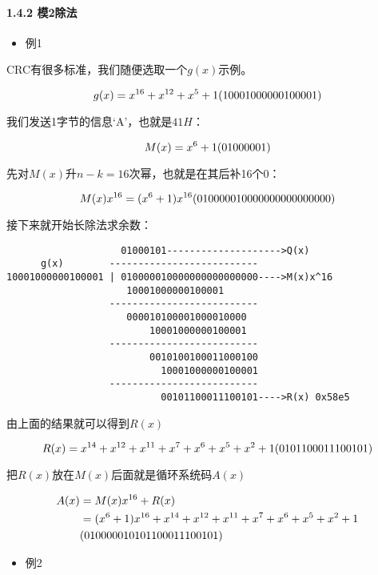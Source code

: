 \documentclass[
]{article}
\begin{document}
\hypertarget{header-n87}{%
\paragraph{1.4.2 模2除法}\label{header-n87}}

\begin{itemize}
\item
  例1
\end{itemize}

CRC有很多标准，我们随便选取一个\(g(x)\)示例。

\[g(x)=x^{16}+x^{12}+x^5+1\\
(10001000000100001)\]

我们发送1字节的信息`A'，也就是\(41H\)：

\[M(x)=x^6+1\\
(01000001)\]

先对\(M(x)\)升\(n-k=16\)次幂，也就是在其后补16个0：

\[M(x)x^{16}=(x^6+1)x^{16}\\
(010000010000000000000000)\]

接下来就开始长除法求余数：

\begin{verbatim}
                    01000101-------------------->Q(x)
      g(x)        --------------------------
10001000000100001 | 010000010000000000000000---->M(x)x^16
                     10001000000100001
                  --------------------------
                     000010100001000010000
                         10001000000100001
                  --------------------------
                         0010100100011000100
                           10001000000100001
                  --------------------------
                           00101100011100101---->R(x) 0x58e5
\end{verbatim}

由上面的结果就可以得到\(R(x)\)

\[R(x)=x^{14}+x^{12}+x^{11}+x^{7}+x^{6}+x^{5}+x^{2}+1\\
(0101100011100101)\]

把\(R(x)\)放在\(M(x)\)后面就是循环系统码\(A(x)\)

\begin{align}
A(x)&=M(x)x^{16}+R(x)\\
&=(x^6+1)x^{16}+x^{14}+x^{12}+x^{11}+x^{7}+x^{6}+x^{5}+x^{2}+1\\
&(01000001 \space 0101100011100101)
\end{align}

\begin{itemize}
\item
  例2
\end{itemize}
\end{document}
